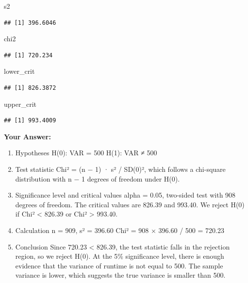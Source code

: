 \documentclass[
]{article}
\newenvironment{Shaded}{\begin{snugshade}}{\end{snugshade}}
\newcommand{\NormalTok}[1]{#1}
\providecommand{\tightlist}{%
  \setlength{\itemsep}{0pt}\setlength{\parskip}{0pt}}
\begin{document}
\begin{Shaded}
\begin{Highlighting}[]
\NormalTok{s2}
\end{Highlighting}
\end{Shaded}

\begin{verbatim}
## [1] 396.6046
\end{verbatim}

\begin{Shaded}
\begin{Highlighting}[]
\NormalTok{chi2}
\end{Highlighting}
\end{Shaded}

\begin{verbatim}
## [1] 720.234
\end{verbatim}

\begin{Shaded}
\begin{Highlighting}[]
\NormalTok{lower\_crit}
\end{Highlighting}
\end{Shaded}

\begin{verbatim}
## [1] 826.3872
\end{verbatim}

\begin{Shaded}
\begin{Highlighting}[]
\NormalTok{upper\_crit}
\end{Highlighting}
\end{Shaded}

\begin{verbatim}
## [1] 993.4009
\end{verbatim}

\textbf{Your Answer:}

\begin{enumerate}
\def\labelenumi{\arabic{enumi}.}
\tightlist
\item
  Hypotheses H(0): VAR = 500 H(1): VAR ≠ 500
\item
  Test statistic Chi² = (n − 1) · s² / SD(0)², which follows a
  chi-square distribution with n − 1 degrees of freedom under H(0).
\item
  Significance level and critical values alpha = 0.05, two-sided test
  with 908 degrees of freedom. The critical values are 826.39 and
  993.40. We reject H(0) if Chi² \textless{} 826.39 or Chi²
  \textgreater{} 993.40.
\item
  Calculation n = 909, s² = 396.60 Chi² = 908 × 396.60 / 500 = 720.23
\item
  Conclusion Since 720.23 \textless{} 826.39, the test statistic falls
  in the rejection region, so we reject H(0). At the 5\% significance
  level, there is enough evidence that the variance of runtime is not
  equal to 500. The sample variance is lower, which suggests the true
  variance is smaller than 500.
\end{enumerate}
\end{document}
